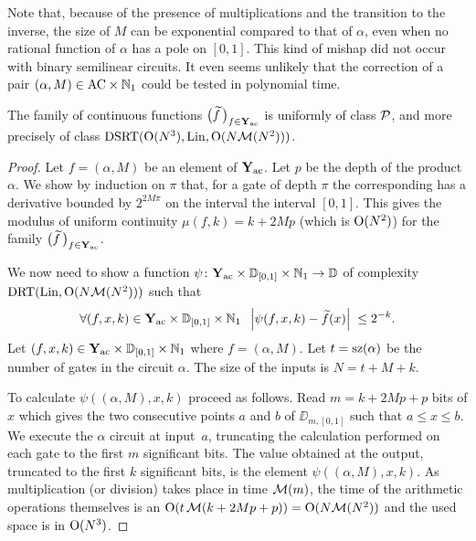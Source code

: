 Note that, because of the presence of multiplications and the transition  to the inverse, the size of $M$ can be exponential compared to that of $\alpha$, even when no rational function of $\alpha$ has a pole on $[0,1]$. This kind of mishap did not occur with binary semilinear circuits.
It even seems unlikely that the correction of a pair $(\alpha, M) \in {\rm AC} \times \mathbb {N}_1$ could be tested in polynomial time. 

\begin{proposition} \label{4111} 
The family of continuous functions $\big(\widetilde{f}\,\big)_{f \in {{\bf Y}_{\rm ac}} }$ is uniformly of class  ${\cal P}$, and more precisely of class ${\rm DSRT}({\rm O}(N^3),{\rm Lin},{\rm O}(N{{{\cal M}}}(N^2)))$.
\end{proposition}

\begin{proof} Let $ f = (\alpha,M) $ be an element of ${{\bf Y}_{\rm ac}}$. Let $ p $ be the 
depth of the product $\alpha$. We show by induction on $\pi$ that, for 
a gate of depth $\pi$ the corresponding 
has a derivative bounded by $2^{2M \pi}$ on the interval 
the interval $[0,1]$. This gives the modulus of uniform continuity $\mu(f,k) = k + 2Mp$ (which is ${\rm O}(N^2)$) for the family $\big(\widetilde{f}\,\big)_{f \in {{\bf Y}_{\rm ac}} }$. 

\noindent 
We now need to show a function 
$\psi\colon {{\bf Y}_{\rm ac}} \times \mathbb {D}_{[0,1]} \times \mathbb {N}_1 \to \mathbb {D}$ 
of complexity $ {\rm DRT}({\rm Lin},{\rm O}(N{{\cal M}}(N^2))) $ such that
\[
\forall (f, x, k) \in {{\bf Y}_{\rm ac}}  \times \mathbb {D}_{[0,1]} \times \mathbb {N}_1 \; \;
\left|{ \psi(f,x,k) - \widetilde{f}(x)}\right| \;  \leq 2^{-k}.
\]
Let $(f, x, k) \in {{\bf Y}_{\rm ac}} \times \mathbb {D}_{[0,1]} \times \mathbb {N}_1$ where 
$f = (\alpha,M)$. Let $ t = {\rm sz}(\alpha) $ be the number of gates in the circuit $\alpha$. The size of the inputs is $N = t+M+k$. 

\noindent 
To calculate $\psi((\alpha,M), x, k)$ proceed as follows. 
Read $ m = k+2Mp+p $ bits of $x$ which gives the two consecutive points
 $a$ and $b$ of $\DD_{m,[0,1]}$ such that $a \leq x \leq b$. 
We execute the $\alpha$ circuit at input~$a$, truncating the calculation performed on each gate to the first $m$ significant bits. The value obtained at the output, truncated to the first $k$ significant bits, is the element $\psi((\alpha,M), x, k)$. 
As multiplication (or division) takes place in time ${{{\cal M}}}(m)$, the time of the arithmetic operations themselves is an ${\rm O}(t\,{{\cal M}}(k+2Mp+p))= {\rm O}(N{{\cal M}}(N^2))$ and the used space is in ${\rm O}(N^3)$. 
\end{proof}
 

